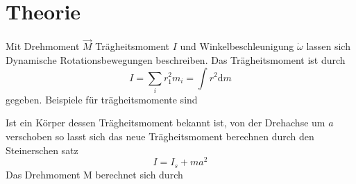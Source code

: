 

\section{Theorie}
\label{sec:Theorie}
Mit Drehmoment $\vec{M}$ Trägheitsmoment $I$ und Winkelbeschleunigung $\dot{\omega}$
lassen sich Dynamische Rotationsbewegungen beschreiben. Das Trägheitsmoment ist
durch
\begin{equation}
  I=\sum_i r_1^2m_i=\int r^2 \text{d}m
\end{equation}
gegeben.
Beispiele für trägheitsmomente sind
\begin{figure}
\end{figure}
Ist ein Körper dessen Trägheitsmoment bekannt ist, von der Drehachse um
$a$ verschoben so lasst sich das neue Trägheitsmoment berechnen durch den
Steinerschen satz
\begin{equation}
  I=I_s+m a^2
\end{equation}
Das Drehmoment M berechnet sich durch
  \cite{sample}
